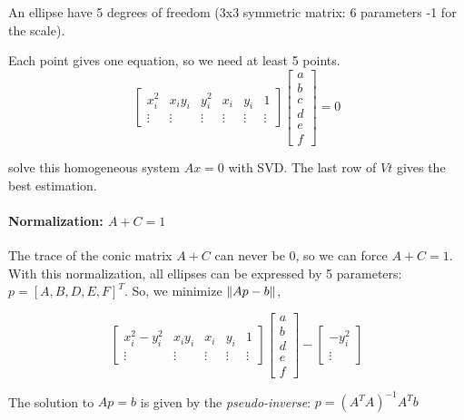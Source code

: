 An ellipse have 5 degrees of freedom (3x3 symmetric matrix: 6 parameters -1 for the scale).

Each point gives one equation, so we need at least 5 points.
\begin{equation}
    \left[
    \begin{array}{cccccc}
    x_i^2 & x_i y_i & y_i^2 & x_i & y_i & 1  \\
    \vdots &\vdots &\vdots &\vdots &\vdots &\vdots 
    \end{array}
    \right]
    \left[\begin{array}{c}
        a \\ b \\ c \\ d \\ e \\ f
    \end{array} \right]
    = 0
\end{equation}

solve this homogeneous system $Ax=0$ with SVD. The last row of $Vt$ gives the best estimation.

\paragraph{Normalization: $A + C = 1$}
The trace of the conic matrix $A + C$ can never be 0, so we can force $A + C = 1$.
With this normalization, all ellipses can be expressed by 5 parameters: $p = [A, B, D, E, F]^T$. So, we minimize $\left\lVert Ap-b\right\rVert$,

\begin{equation}
    \left[
    \begin{array}{ccccc}
    x_i^2 - y_i^2 & x_i y_i & x_i & y_i & 1  \\
    \vdots &\vdots &\vdots &\vdots &\vdots 
    \end{array}
    \right]
    \left[\begin{array}{c}
        a \\ b \\ d \\ e \\ f
    \end{array} \right]
     - 
    \left[\begin{array}{c}
        -y_i^2 \\
        \vdots
    \end{array} \right]
\end{equation}


The solution to $Ap=b$ is given by the \textit{pseudo-inverse}: $p = (A^T A)^{-1} A^T b$



